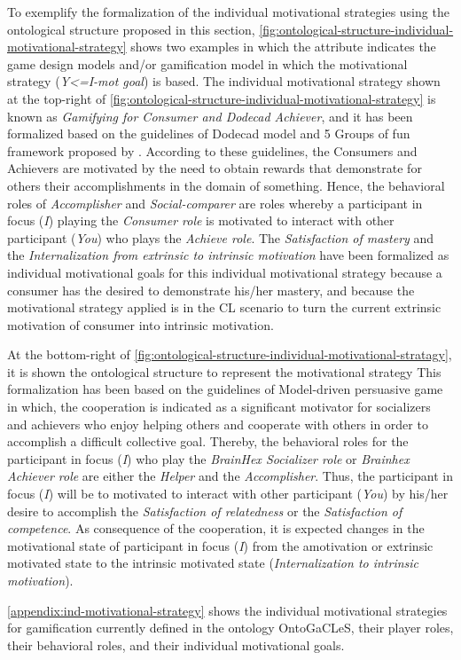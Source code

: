 To exemplify the formalization of the individual motivational strategies using the ontological structure proposed in this section, \autoref{fig:ontological-structure-individual-motivational-strategy} shows two examples in which the attribute  indicates the game design models and/or gamification model in which the motivational strategy (\emph{Y<=I-mot goal}) is based. The individual motivational strategy shown at the top-right of \autoref{fig:ontological-structure-individual-motivational-strategy} is known as \emph{Gamifying for Consumer and Dodecad Achiever}, and it has been formalized based on the guidelines of Dodecad model and 5 Groups of fun framework proposed by . According to these guidelines, the Consumers and Achievers are motivated by the need to obtain rewards that demonstrate for others their accomplishments in the domain of something. Hence, the behavioral roles of \emph{Accomplisher} and \emph{Social-comparer} are roles whereby a participant in focus (\emph{I}) playing the \emph{Consumer role} is motivated to interact with other participant (\emph{You}) who plays the \emph{Achieve role}. The \emph{Satisfaction of mastery} and the \emph{Internalization from extrinsic to intrinsic motivation} have been formalized as individual motivational goals for this individual motivational strategy because a consumer has the desired to demonstrate his/her mastery, and because the motivational strategy applied is in the CL scenario to turn the current extrinsic motivation of consumer into intrinsic motivation.

At the bottom-right of \autoref{fig:ontological-structure-individual-motivational-stratagy}, it is shown the ontological structure to represent the motivational strategy  This formalization has been based on the guidelines of Model-driven persuasive game \cite{OrjiVassilevaMandryk2014} in which, the cooperation is indicated as a significant motivator for socializers and achievers who enjoy helping others and cooperate with others in order to accomplish a difficult collective goal. Thereby, the behavioral roles for the participant in focus (\emph{I}) who play the \emph{BrainHex Socializer role} or \emph{Brainhex Achiever role} are either the \emph{Helper} and the \emph{Accomplisher}. Thus, the participant in focus (\emph{I}) will be to motivated to interact with other participant (\emph{You}) by his/her desire to accomplish the \emph{Satisfaction of relatedness} or the \emph{Satisfaction of competence}. As consequence of the cooperation, it is expected changes in the motivational state of participant in focus (\emph{I}) from the amotivation or extrinsic motivated state to the intrinsic motivated state (\emph{Internalization to intrinsic motivation}).

\autoref{appendix:ind-motivational-strategy} shows the individual motivational strategies for gamification currently defined in the ontology OntoGaCLeS, their player roles, their behavioral roles, and their individual motivational goals.

